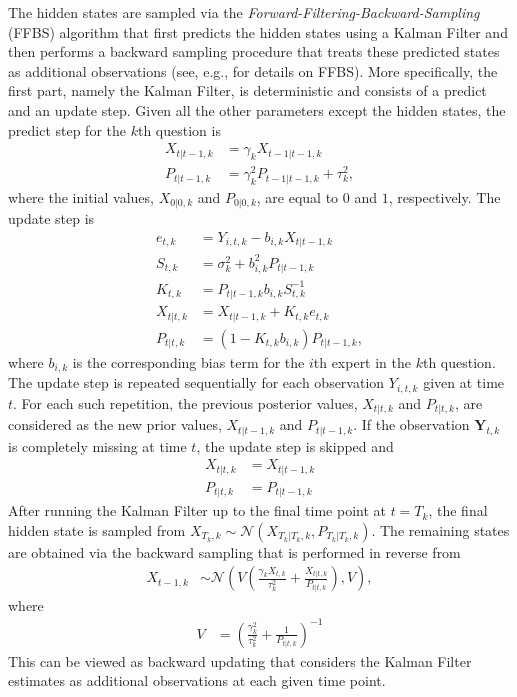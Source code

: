 \documentclass[aoas, preprint]{imsart}
\numberwithin{equation}{section}
\theoremstyle{plain}
\begin{document}
\begin{center}
\end{center}
The hidden states are sampled via the \textit{Forward-Filtering-Backward-Sampling} (FFBS) algorithm that first predicts the hidden states using a Kalman Filter and then performs a backward sampling procedure that treats these predicted states as additional observations (see, e.g., \cite{carter1994gibbs, migon2005dynamic} for details on FFBS). More specifically, the first part, namely the Kalman Filter, is deterministic and consists of a predict and an update step. Given all the other parameters except the hidden states, the predict step for the $k$th question is
\begin{align*}
X_{t|t-1,k} &= \gamma_k X_{t-1|t-1,k} \\
P_{t|t-1, k} &= \gamma_k^2 P_{t-1|t-1, k} + \tau_k^2,
\end{align*}
where the initial values, $X_{0|0,k}$ and $P_{0|0, k}$, are equal to $0$ and $1$, respectively. The update step is 
\begin{align*}
e_{t,k} &= Y_{i,t,k} - b_{i,k} X_{t | t-1, k} \\
S_{t,k} &=  \sigma_k^2 + b_{i,k}^2 P_{t|t-1, k}\\
K_{t,k} &=  P_{t|t-1, k} b_{i,k} S_{t,k}^{-1} \\
X_{t|t, k} &= X_{t|t-1, k} + K_{t,k} e_{t,k} \\
P_{t|t,k} &= (1 - K_{t,k} b_{i,k}) P_{t|t-1,k},
\end{align*}
where $b_{i,k}$ is the corresponding bias term for the $i$th expert in the $k$th question. The update step is repeated sequentially for each observation $Y_{i,t,k}$ given at time $t$. For each such repetition, the previous posterior values, $X_{t|t, k}$ and $P_{t|t, k}$, are considered as the new prior values, $X_{t|t-1, k}$ and $P_{t|t-1, k}$. If the observation $\boldsymbol{Y}_{t,k}$ is completely missing at time $t$, the update step is skipped and 
\begin{align*}
X_{t|t, k} &= X_{t|t-1, k}\\
P_{t|t,k} &= P_{t|t-1,k}
\end{align*}
After running the Kalman Filter up to the final time point at $t = T_k$, the final hidden state is sampled from $X_{T_k,k} \sim \mathcal{N}(X_{T_k|T_k, k}, P_{T_k|T_k, k})$. The remaining states are obtained via the backward sampling that is performed in reverse from
\begin{align*}
X_{t-1, k} &\sim  \mathcal{N} \left(V\left( \frac{\gamma_kX_{t,k}}{\tau_k^2}  + \frac{X_{t|t,k}}{P_{t|t,k} } \right),  V\right),
\end{align*}
where
\begin{align*}
V &= \left( \frac{\gamma_k^2}{\tau_k^2} + \frac{1}{P_{t|t,k}}\right)^{-1}
\end{align*}
This can be viewed as backward updating that considers the Kalman Filter estimates as additional observations at each given time point. 
\end{document}
